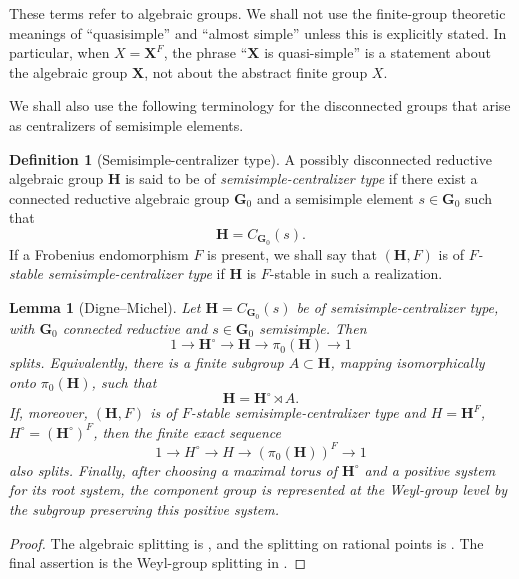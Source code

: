 \documentclass{amsart}
\theoremstyle{plain}
\numberwithin{equation}{section}
\newtheorem{lemma}[theorem]{Lemma}
\theoremstyle{definition}
\newtheorem{definition}[theorem]{Definition}
\begin{document}
These terms refer to algebraic groups.  We shall not use the finite-group
theoretic meanings of ``quasisimple'' and ``almost simple'' unless this is
explicitly stated.  In particular, when \(X=\mathbf X^F\), the phrase
``\(\mathbf X\) is quasi-simple'' is a statement about the algebraic group
\(\mathbf X\), not about the abstract finite group \(X\).

We shall also use the following terminology for the disconnected groups that
arise as centralizers of semisimple elements.

\begin{definition}[Semisimple-centralizer type]
\label{def:semisimple-centralizer-type}
A possibly disconnected reductive algebraic group \(\mathbf H\) is said to be
of \emph{semisimple-centralizer type} if there exist a connected reductive
algebraic group \(\mathbf G_0\) and a semisimple element \(s\in \mathbf G_0\)
such that
\[
        \mathbf H=C_{\mathbf G_0}(s).
\]
If a Frobenius endomorphism \(F\) is present, we shall say that \((\mathbf H,F)\)
is of \emph{\(F\)-stable semisimple-centralizer type} if \(\mathbf H\) is
\(F\)-stable in such a realization.
\end{definition}

\begin{lemma}[Digne--Michel]
\label{lem:DM-semisimple-centralizer-splits}
Let \(\mathbf H=C_{\mathbf G_0}(s)\) be of semisimple-centralizer type, with
\(\mathbf G_0\) connected reductive and \(s\in \mathbf G_0\) semisimple.  Then
\[
1\longrightarrow \mathbf H^\circ
\longrightarrow \mathbf H
\longrightarrow \pi_0(\mathbf H)
\longrightarrow 1
\]
splits.  Equivalently, there is a finite subgroup \(A\subset \mathbf H\),
mapping isomorphically onto \(\pi_0(\mathbf H)\), such that
\[
        \mathbf H=\mathbf H^\circ\rtimes A .
\]
If, moreover, \((\mathbf H,F)\) is of \(F\)-stable semisimple-centralizer type
and \(H=\mathbf H^F\), \(H^\circ=(\mathbf H^\circ)^F\), then the finite exact
sequence
\[
1\longrightarrow H^\circ
\longrightarrow H
\longrightarrow (\pi_0(\mathbf H))^F
\longrightarrow 1
\]
also splits.  Finally, after choosing a maximal torus of \(\mathbf H^\circ\)
and a positive system for its root system, the component group is represented
at the Weyl-group level by the subgroup preserving this positive system.
\end{lemma}

\begin{proof}
The algebraic splitting is \cite[Theorem~0.1]{DigneMichel2026Centralizers}, and
the splitting on rational points is \cite[Theorem~0.2]{DigneMichel2026Centralizers}.
The final assertion is the Weyl-group splitting in
\cite[Proposition~1.1]{DigneMichel2026Centralizers}.
\end{proof}
\end{document}
